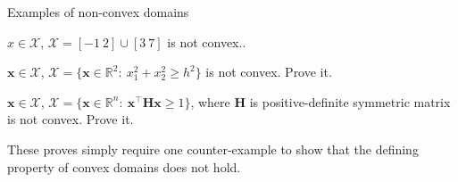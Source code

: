 \documentclass{beamer}
\begin{document}
\begin{frame}{Examples of non-convex domains}
\begin{flushleft}

%

$x \in \mathcal{X}$, $\mathcal{X} = [-1 \ 2] \cup [3 \ 7]$ is not convex..

\bigskip

$\mathbf{x} \in \mathcal{X}$, $\mathcal{X} = \{ \mathbf{x} \in \mathbb{R}^2: \ x_1^2+x_2^2 \geq h^2 \}$ is not convex. Prove it.

\bigskip

$\mathbf{x} \in \mathcal{X}$, $\mathcal{X} = \{ \mathbf{x} \in \mathbb{R}^n: \ \mathbf{x}^\top \mathbf{H} \mathbf{x} \geq 1 \}$, where $\mathbf{H}$ is positive-definite symmetric matrix is not convex. Prove it.

\bigskip

These proves simply require one counter-example to show that the defining property of convex domains does not hold.
 
\end{flushleft}
\end{frame}
\end{document}
